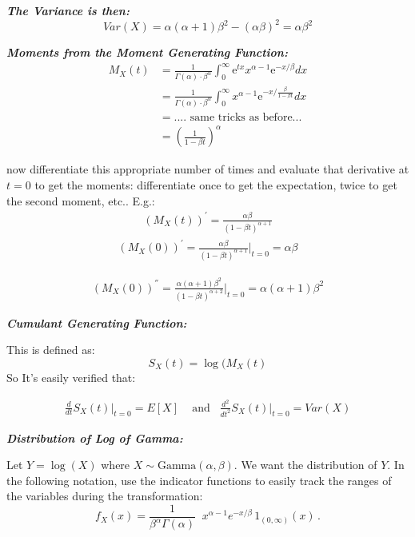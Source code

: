 \documentclass[12pt]{article}
\begin{document}
\textbf{\color{TealBlue}\emph{The Variance is then:} } 
$$
Var(X) = \alpha (\alpha + 1) \beta^2 - (\alpha \beta)^2 = \alpha \beta^2
$$

\textbf{\color{TealBlue}\emph{Moments from the Moment Generating Function:} } 
\begin{align*}
M_X(t) &=  \frac{1}{\Gamma(\alpha) \cdot \beta^{\alpha}} \int_0^{\infty} \mathrm{e}^{tx} x^{\alpha - 1} \mathrm{e}^{-x/\beta} dx\\
&=  \frac{1}{\Gamma(\alpha) \cdot \beta^{\alpha}} \int_0^{\infty}  x^{\alpha - 1} \mathrm{e}^{ - x/ \frac{\beta}{1 - \beta t }} dx \\
&= .... \text{\ \ same tricks as before...}\\
&= \left( \frac{1} { 1 - \beta t } \right)^{\alpha}
\end{align*}

now differentiate this appropriate number of times and evaluate that derivative at $t = 0$ to get the moments: differentiate once to get the expectation, twice to get the second moment, etc.. E.g.:
\begin{align*}
(M_X(t))^{'} = \frac{\alpha \beta} { (1 - \beta t)^{\alpha + 1}}  
\end{align*}
\begin{align*}
(M_X(0))^{'} =  \frac{\alpha \beta} { (1 - \beta t)^{\alpha + 1}}  \Big | _{t=0} = \alpha \beta
\end{align*}

\begin{align*}
(M_X(0))^{''} =  \frac{\alpha (\alpha + 1) \beta^2} { (1 - \beta t)^{\alpha + 2}}  \Big | _{t=0} = \alpha (\alpha + 1)\beta^2
\end{align*}


\textbf{\color{TealBlue}\emph{Cumulant Generating Function:} } 

This is defined as:
$$
S_X(t) = \log (M_X(t)
$$
So 
It's easily verified that:


\begin{align*}
\frac{d}{dt} S_X(t) \Big|_{t=0} = E[X] \;\;\; \text{ and} \;\;\; \frac{d^2}{dt^2} S_X(t) \Big|_{t=0} = Var(X) 
\end{align*}

\bigskip
\textbf{\color{TealBlue}\emph{Distribution of Log of Gamma:} } 


Let $Y = \log (X)$ where  $X\sim\mathrm{Gamma}(\alpha,\beta)$.  We want the distribution of $Y$. In the following notation, use the indicator functions to easily track the ranges of the variables during the transformation: 
$$ f_X(x) = \frac{1}{\beta^{\alpha}\Gamma(\alpha)} \;\; x^{\alpha-1} e^{-x/\beta} \, 1_{(0,\infty)}(x) \, . $$
\end{document}
